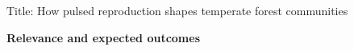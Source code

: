 \documentclass[11pt]{article}
\begin{document}

\renewcommand{\refname}{\CHead{}}

\setlength{\parindent}{0cm}
\setlength{\parskip}{5pt}



Title: How pulsed reproduction shapes temperate forest communities 





{\bf Relevance and expected outcomes} %
\end{document}
